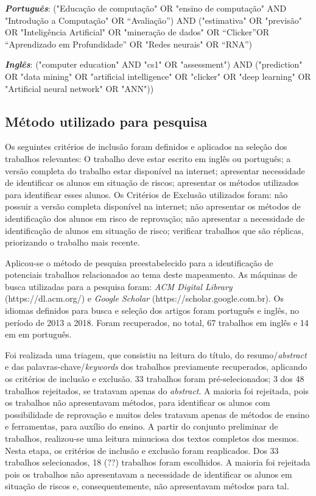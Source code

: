 \documentclass[12pt]{article}
\begin{document}
    \textit{\textbf{Português}}: ("Educação de computação" OR "ensino de computação" AND "Introdução a Computação" OR “Avaliação”) AND ("estimativa" OR "previsão" OR "Inteligência Artificial" OR "mineração de dados" OR “Clicker”OR “Aprendizado em Profundidade” OR "Redes neurais" OR “RNA”)

    \textit{\textbf{Inglês}}: ("computer education" AND "cs1" OR "assessment") AND ("prediction" OR "data mining" OR "artificial intelligence" OR "clicker" OR "deep learning" OR "Artificial neural network" OR "ANN"))

\subsection{Método utilizado para pesquisa}
Os seguintes critérios de inclusão foram definidos e aplicados na seleção dos trabalhos relevantes: O trabalho deve estar escrito em inglês ou português; a versão completa do trabalho estar disponível na internet; apresentar necessidade de identificar os alunos em situação de riscos;  apresentar os métodos utilizados para identificar esses alunos. Os Critérios de Exclusão utilizados foram: não possuir a versão completa disponível na internet; não apresentar os métodos de identificação dos alunos em risco de reprovação; não apresentar a necessidade de identificação de alunos em situação de risco; verificar trabalhos que são réplicas, priorizando o trabalho mais recente.

Aplicou-se o método de pesquisa preestabelecido para a identificação de potenciais trabalhos relacionados ao tema deste mapeamento. 
As máquinas de busca utilizadas para a pesquisa foram: \textit{ACM Digital Library} (https://dl.acm.org/) e \textit{Google Scholar} (https://scholar.google.com.br).
Os idiomas definidos para busca e seleção dos artigos foram português e inglês, no período de 2013 a 2018. Foram recuperados, no total, 67 trabalhos em inglês e 14 em em português.

Foi realizada uma triagem, que consistiu na leitura do título, do resumo/\textit{abstract} e das palavras-chave/\textit{keywords} dos trabalhos previamente recuperados, aplicando os critérios de inclusão e exclusão. 
33 trabalhos foram pré-selecionados; 3 dos 48 trabalhos rejeitados, se tratavam apenas do \textit{abstract}. 
A maioria foi rejeitada, pois os trabalhos não apresentavam métodos, para identificar os alunos com possibilidade de reprovação e muitos deles tratavam apenas de métodos de ensino e ferramentas, para auxílio do ensino.
A partir do conjunto preliminar de trabalhos, realizou-se uma leitura minuciosa dos textos completos dos mesmos. Nesta etapa, os critérios de inclusão e exclusão foram reaplicados. 
Dos 33 trabalhos selecionados, 18 (??) trabalhos foram escolhidos. A maioria foi rejeitada pois os trabalhos não apresentavam a necessidade de identificar os alunos em situação de riscos e, consequentemente, não apresentavam métodos para tal.
\end{document}
